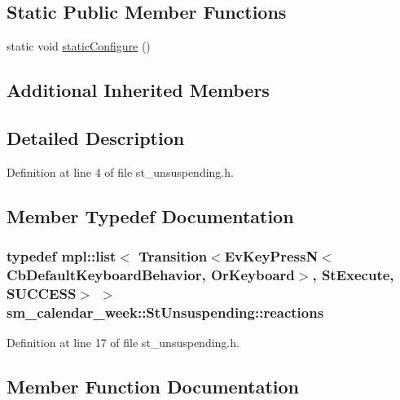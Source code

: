 \subsection*{Static Public Member Functions}
\begin{DoxyCompactItemize}
\item 
static void \hyperlink{structsm__calendar__week_1_1StUnsuspending_a0f7ed2242ee628a055e13fed18e521b7}{static\+Configure} ()
\end{DoxyCompactItemize}
\subsection*{Additional Inherited Members}


\subsection{Detailed Description}


Definition at line 4 of file st\+\_\+unsuspending.\+h.



\subsection{Member Typedef Documentation}
\subsubsection[{\texorpdfstring{reactions}{reactions}}]{\setlength{\rightskip}{0pt plus 5cm}typedef mpl\+::list$<$ Transition$<$Ev\+Key\+PressN$<$Cb\+Default\+Keyboard\+Behavior, {\bf Or\+Keyboard}$>$, {\bf St\+Execute}, {\bf S\+U\+C\+C\+E\+SS}$>$ $>$ {\bf sm\+\_\+calendar\+\_\+week\+::\+St\+Unsuspending\+::reactions}}\hypertarget{structsm__calendar__week_1_1StUnsuspending_ae1e74bc7e78c1d1b0d1f0caa5380e974}{}\label{structsm__calendar__week_1_1StUnsuspending_ae1e74bc7e78c1d1b0d1f0caa5380e974}


Definition at line 17 of file st\+\_\+unsuspending.\+h.



\subsection{Member Function Documentation}
